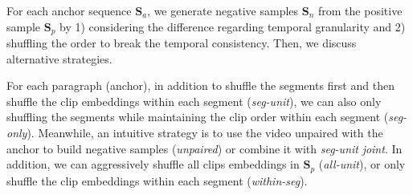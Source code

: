 For each anchor sequence $\mathbf{S}_a$, we generate negative samples $\mathbf{S}_n$ from the positive sample $\mathbf{S}_p$ by 1) considering the difference regarding temporal granularity and 2) shuffling the order to break the temporal consistency. Then, we discuss alternative strategies.

 For each paragraph (anchor), in addition to shuffle the segments first and then shuffle the clip embeddings within each segment (\textit{seg-unit}), we can also only shuffling the segments while maintaining the clip order within each segment (\textit{seg-only}).
Meanwhile, an intuitive strategy is to use the video unpaired with the anchor to build negative samples (\textit{unpaired}) or combine it with \textit{seg-unit} \textit{joint}.
In addition, we can aggressively shuffle all clips embeddings in $\mathbf{S}_p$ (\textit{all-unit}), or only shuffle the clip embeddings within each segment (\textit{within-seg}).

